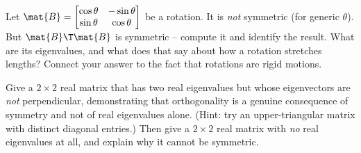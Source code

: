 \begin{exercise}
\label{ch26:ex-challenge}
Let $\mat{B}=\begin{bmatrix}\cos\theta&-\sin\theta\\\sin\theta&\cos\theta\end{bmatrix}$
be a rotation. It is \emph{not} symmetric (for generic $\theta$). But
$\mat{B}\T\mat{B}$ is symmetric -- compute it and identify the result. What are its
eigenvalues, and what does that say about how a rotation stretches lengths?
Connect your answer to the fact that rotations are rigid motions.
\end{exercise}

\begin{exercise}
\label{ch26:ex-fail}
Give a $2\times 2$ real matrix that has two real eigenvalues but whose
eigenvectors are \emph{not} perpendicular, demonstrating that orthogonality is a
genuine consequence of symmetry and not of real eigenvalues alone. (Hint: try an
upper-triangular matrix with distinct diagonal entries.) Then give a $2\times 2$
real matrix with \emph{no} real eigenvalues at all, and explain why it cannot be
symmetric.
\end{exercise}
